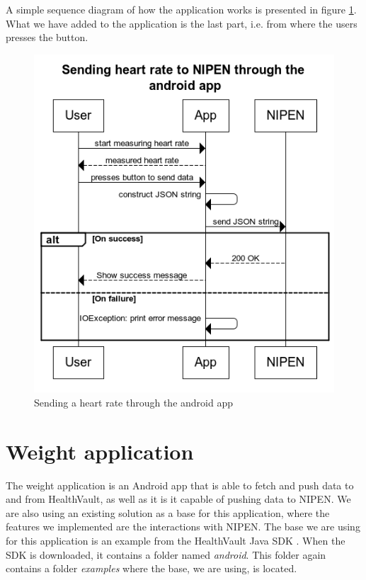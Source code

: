 A simple sequence diagram of how the application works is presented in figure \ref{figure:sending-heart-rate-through-app}.
What we have added to the application is the last part, i.e. from where the users presses the button.

\begin{figure}[h]
\centering
\includegraphics[scale=1.0]{../Figures/sending-heart-rate-through-app.png}
\caption{Sending a heart rate through the android app}
\label{figure:sending-heart-rate-through-app}
\end{figure}

\section{Weight application}

The weight application is an Android app that is able to fetch and push data to and from HealthVault, as well as
it is it capable of pushing data to NIPEN.
We are also using an existing solution as a base for this application, where the features we implemented are
the interactions with NIPEN.
The base we are using for this application is an example from the HealthVault Java SDK \cite{HealthVaultSDK}.
When the SDK is downloaded, it contains a folder named \textit{android}. 
This folder again contains a folder \textit{examples} where the base, we are using, is located.

